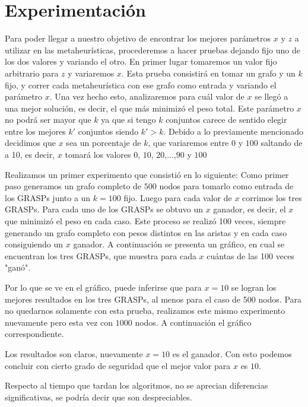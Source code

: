 \section{Experimentación}

Para poder llegar a nuestro objetivo de encontrar los mejores parámetros $x$ y $z$ a utilizar en las metaheurísticas, procederemos a hacer pruebas dejando fijo uno de los dos valores y variando el otro.
En primer lugar tomaremos un valor fijo arbitrario para $z$ y variaremos $x$. Esta prueba consistirá en tomar un grafo y un $k$ fijo, y correr cada metaheurística con ese grafo como entrada y variando el parámetro $x$. Una vez hecho esto, analizaremos para cuál valor de $x$ se llegó a una mejor solución, es decir, el que más minimizó el peso total. Este parámetro $x$ no podrá ser mayor que $k$ ya que si tengo $k$ conjuntos carece de sentido elegir entre los mejores $k'$ conjuntos siendo $k'>k$. Debido a lo previamente mencionado decidimos que $x$ sea un porcentaje de $k$, que variaremos entre $0$ y $100$ saltando de a 10, es decir, $x$ tomará los valores $0$, $10$, $20$,...,$90$ y $100$ 

Realizamos un primer experimento que consistió en lo siguiente:
Como primer paso generamos un grafo completo de $500$ nodos para tomarlo como entrada de los GRASPs junto a un $k=100$ fijo. Luego para cada valor de $x$ corrimos los tres GRASPs. Para cada uno de los GRASPs se obtuvo un $x$ ganador, es decir, el $x$ que minimizó el peso en cada caso. Este proceso se realizó 100 veces, siempre generando un grafo completo con pesos distintos en las aristas y en cada caso consiguiendo un $x$ ganador. A continuación se presenta un gráfico, en cual se encuentran los tres GRASPs, que muestra para cada $x$ cuántas de las 100 veces "ganó". 


Por lo que se ve en el gráfico, puede inferirse que para $x=10$ se logran los mejores resultados en los tres GRASPs, al menos para el caso de 500 nodos. Para no quedarnos solamente con esta prueba, realizamos este mismo experimento nuevamente pero esta vez con $1000$ nodos. A continuación el gráfico correspondiente.


Los resultados son claros, nuevamente $x=10$ es el ganador. Con esto podemos concluir con cierto grado de seguridad que el mejor valor para $x$ es $10$.

Respecto al tiempo que tardan los algoritmos, no se aprecian diferencias significativas, se podría decir que son despreciables.

